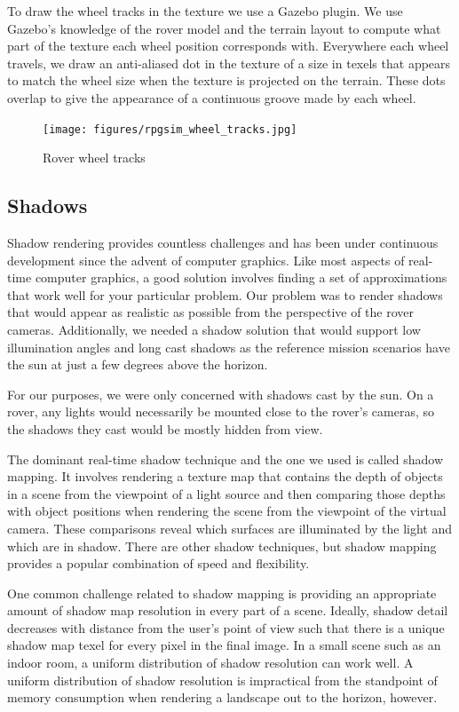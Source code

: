 \documentclass[twocolumn,letterpaper]{IEEEAerospaceCLS}  %
\begin{document}
To draw the wheel tracks in the texture we use a Gazebo plugin.  
We use Gazebo's knowledge of the rover model and the terrain layout to compute what part of the texture each wheel position corresponds with.  
Everywhere each wheel travels, we draw an anti-aliased dot in the texture of a size in texels that appears to match the wheel size when the texture is projected on the terrain.  
These dots overlap to give the appearance of a continuous groove made by each wheel.
\begin{figure}[h!]
  \texttt{[image: figures/rpgsim\_wheel\_tracks.jpg]}
  \caption{Rover wheel tracks}
  \label{fig:wheeltracks}
\end{figure}

\subsection{Shadows}
Shadow rendering provides countless challenges and has been under continuous development since the advent of computer graphics.  
Like most aspects of real-time computer graphics, a good solution involves finding a set of approximations that work well for your particular problem.  
Our problem was to render shadows that would appear as realistic as possible from the perspective of the rover cameras.  
Additionally, we needed a shadow solution that would support low illumination angles and long cast shadows as the reference mission scenarios have the sun at just a few degrees above the horizon.  

For our purposes, we were only concerned with shadows cast by the sun.  
On a rover, any lights would necessarily be mounted close to the rover's cameras, so the shadows they cast would be mostly hidden from view.

The dominant real-time shadow technique and the one we used is called shadow mapping.  
It involves rendering a texture map that contains the depth of objects in a scene from the viewpoint of a light source and then comparing those depths with object positions when rendering the scene from the viewpoint of the virtual camera.
These comparisons reveal which surfaces are illuminated by the light and which are in shadow.  
There are other shadow techniques, but shadow mapping provides a popular combination of speed and flexibility.

One common challenge related to shadow mapping is providing an appropriate amount of shadow map resolution in every part of a scene.  
Ideally, shadow detail decreases with distance from the user's point of view such that there is a unique shadow map texel for every pixel in the final image.  
In a small scene such as an indoor room, a uniform distribution of shadow resolution can work well.
A uniform distribution of shadow resolution is impractical from the standpoint of memory consumption when rendering a landscape out to the horizon, however.
\end{document}
